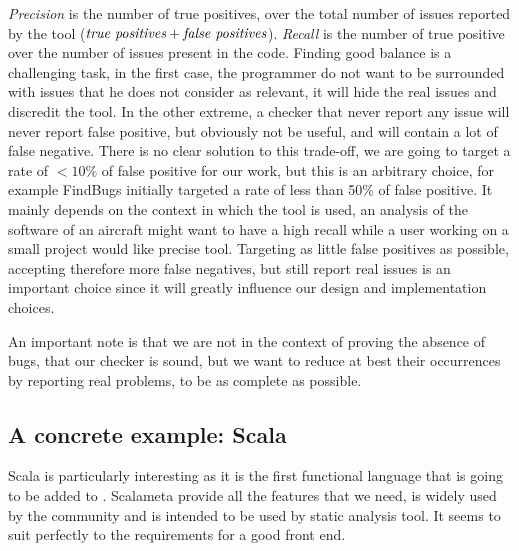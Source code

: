 \emph{Precision} is the number of true positives, over the total number of issues reported by the tool ($ \emph{true positives} + \emph{false positives} $). \emph{Recall} is the number of true positive over the number of issues present in the code. 
Finding good balance is a challenging task, in the first case, the programmer do not want to be surrounded with issues that he does not consider as relevant, it will hide the real issues and discredit the tool. 
In the other extreme, a checker that never report any issue will never report false positive, but obviously not be useful, and will contain a lot of false negative. 
There is no clear solution to this trade-off, we are going to target a rate of $<10\%$ of false positive for our work, but this is an arbitrary choice, for example FindBugs \cite{Hovemeyer:2004:FBE:1052883.1052895} initially targeted a rate of less than 50\% of false positive. 
It mainly depends on the context in which the tool is used, an analysis of the software of an aircraft might want to have a high recall while a user working on a small project would like precise tool. 
Targeting as little false positives as possible, accepting therefore more false negatives, but still report real issues is an important choice since it will greatly influence our design and implementation choices.

An important note is that we are not in the context of proving the absence of bugs, that our checker is sound, but we want to reduce at best their occurrences by reporting real problems, to be as complete as possible.

\subsection{A concrete example: Scala}
\label{subsec:concrete_example}

Scala is particularly interesting as it is the first functional language that is going to be added to \slang{}.
Scalameta \cite{Scalameta:2019:Online} provide all the features that we need, is widely used by the community and is intended to be used by static analysis tool. 
It seems to suit perfectly to the requirements for a good front end.

